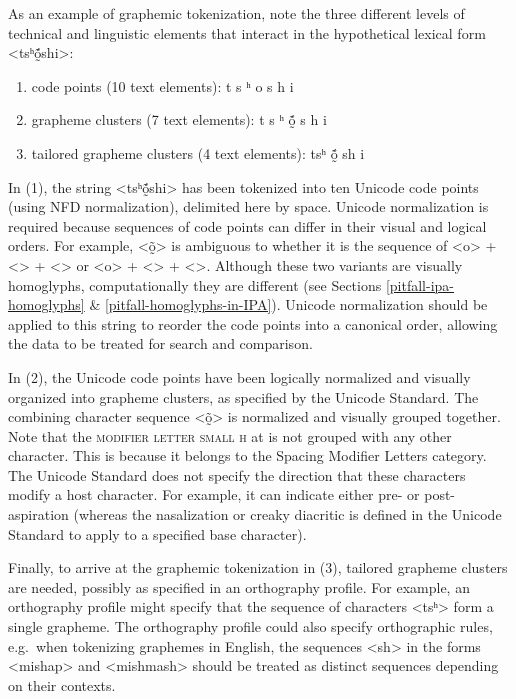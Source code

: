 As an example of graphemic tokenization, note the three different levels of
technical and linguistic elements that interact in the hypothetical lexical
form <tsʰṍ̰shi>:

\begin{enumerate}
	\def\labelenumi{\arabic{enumi}.} 
	\item code points (10 text elements): t s ʰ o    s h i 
	\item grapheme clusters (7 text elements): t s ʰ ṍ̰ s h i 
	\item tailored grapheme clusters (4 text elements): tsʰ ṍ̰ sh i 
\end{enumerate}

In (1), the string <tsʰṍ̰shi> has been tokenized into ten Unicode code points
(using NFD normalization), delimited here by space. Unicode normalization is
required because sequences of code points can differ in their visual and logical
orders. For example, <õ̰> is ambiguous to whether it is the sequence of <o> +
<> + <> or <o> + <> + <>. Although these two variants are visually homoglyphs,
computationally they are different (see Sections \ref{pitfall-ipa-homoglyphs} \& \ref{pitfall-homoglyphs-in-IPA}). 
Unicode normalization should be applied to
this string to reorder the code points into a canonical order, allowing the data
to be treated  for search and comparison. 

In (2), the
Unicode code points have been logically normalized and visually organized into
grapheme clusters, as specified by the Unicode Standard. The combining character
sequence <õ̰> is normalized and visually grouped together. Note that the
\textsc{modifier letter small h} at  is not grouped with any 
other character. This is because it
belongs to the Spacing Modifier Letters category. The Unicode Standard 
does not specify the direction that these characters modify a host
character. For example, it can indicate either pre- or post-aspiration (whereas the
nasalization or creaky diacritic is defined in the Unicode Standard to apply to
a specified base character). 

Finally, to arrive at the graphemic tokenization in (3), tailored grapheme
clusters are needed, possibly as specified in an orthography profile. For example,
an orthography profile might specify that the sequence of characters <tsʰ> form
a single grapheme. The orthography profile could also specify orthographic
rules, e.g.~when tokenizing graphemes in English, the sequences <sh> in the
forms <mishap> and <mishmash> should be treated as distinct sequences depending
on their contexts.


